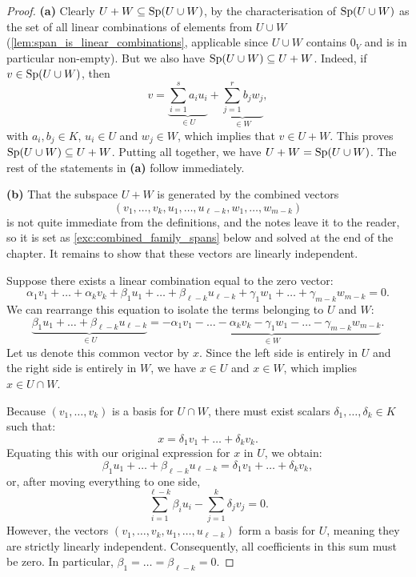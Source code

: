 \begin{proof}
\textbf{(a)} Clearly $U + W \subseteq \operatorname{Sp}(U \cup W)$, by the characterisation of $\operatorname{Sp}(U \cup W)$ as the set of all linear combinations of elements from $U \cup W$ (\cref{lem:span_is_linear_combinations}, applicable since $U \cup W$ contains $0_V$ and is in particular non-empty). But we also have $\operatorname{Sp}(U \cup W) \subseteq U + W$. Indeed, if $v \in \operatorname{Sp}(U \cup W)$, then
\[
v = \underbrace{\sum_{i=1}^{s} a_i u_i}_{\in U} + \underbrace{\sum_{j=1}^{r} b_j w_j}_{\in W},
\]
with $a_i, b_j \in K$, $u_i \in U$ and $w_j \in W$, which implies that $v \in U + W$. This proves $\operatorname{Sp}(U \cup W) \subseteq U + W$. Putting all together, we have $U + W = \operatorname{Sp}(U \cup W)$. The rest of the statements in \textbf{(a)} follow immediately.

\textbf{(b)} That the subspace $U + W$ is generated by the combined vectors
\[
(v_1, \dots, v_k, u_1, \dots, u_{\ell-k}, w_1, \dots, w_{m-k})
\]
is not quite immediate from the definitions, and the notes leave it to the reader, so it is set as \cref{exc:combined_family_spans} below and solved at the end of the chapter. It remains to show that these vectors are linearly independent.

Suppose there exists a linear combination equal to the zero vector:
\begin{equation}
\label{eq:linear_comb_sum}
\alpha_1 v_1 + \dots + \alpha_k v_k + \beta_1 u_1 + \dots + \beta_{\ell-k} u_{\ell-k} + \gamma_1 w_1 + \dots + \gamma_{m-k} w_{m-k} = 0.
\end{equation}
We can rearrange this equation to isolate the terms belonging to $U$ and $W$:
\[
\underbrace{\beta_1 u_1 + \dots + \beta_{\ell-k} u_{\ell-k}}_{\in U} = \underbrace{-\alpha_1 v_1 - \dots - \alpha_k v_k - \gamma_1 w_1 - \dots - \gamma_{m-k} w_{m-k}}_{\in W}.
\]
Let us denote this common vector by $x$. Since the left side is entirely in $U$ and the right side is entirely in $W$, we have $x \in U$ and $x \in W$, which implies $x \in U \cap W$. 

Because $(v_1, \dots, v_k)$ is a basis for $U \cap W$, there must exist scalars $\delta_1, \dots, \delta_k \in K$ such that:
\[
x = \delta_1 v_1 + \dots + \delta_k v_k.
\]
Equating this with our original expression for $x$ in $U$, we obtain:
\[
\beta_1 u_1 + \dots + \beta_{\ell-k} u_{\ell-k} = \delta_1 v_1 + \dots + \delta_k v_k,
\]
or, after moving everything to one side,
\[
\sum_{i=1}^{\ell-k} \beta_i u_i - \sum_{j=1}^k \delta_j v_j = 0.
\]
However, the vectors $(v_1, \dots, v_k, u_1, \dots, u_{\ell-k})$ form a basis for $U$, meaning they are strictly linearly independent. Consequently, all coefficients in this sum must be zero. In particular, $\beta_1 = \dots = \beta_{\ell-k} = 0$.


\end{proof}
